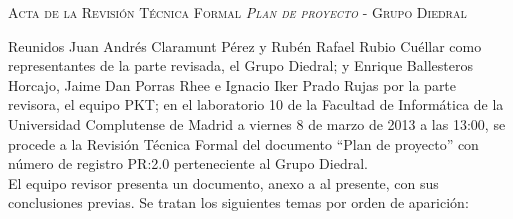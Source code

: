 \documentclass[twoside, a4paper, 11pt]{article}
\begin{document}
	\begin{center}
		\scshape \large Acta de la Revisión Técnica Formal \textit{Plan de proyecto} - Grupo Diedral \vspace{.5cm}
	\end{center}

	Reunidos Juan Andrés Claramunt Pérez y Rubén Rafael Rubio Cuéllar como representantes de la parte revisada, el Grupo Diedral; y Enrique Ballesteros Horcajo, Jaime Dan Porras Rhee e Ignacio Iker Prado Rujas  por la parte revisora, el equipo PKT; en el laboratorio 10 de la Facultad de Informática de la Universidad Complutense de Madrid a viernes 8 de marzo de 2013 a las 13:00, se procede a la Revisión Técnica Formal del documento ``Plan de proyecto'' con número de registro PR:2.0 perteneciente al Grupo Diedral.\\

	El equipo revisor presenta un documento, anexo a al presente, con sus conclusiones previas. Se tratan los siguientes temas por orden de aparición:
\end{document}
